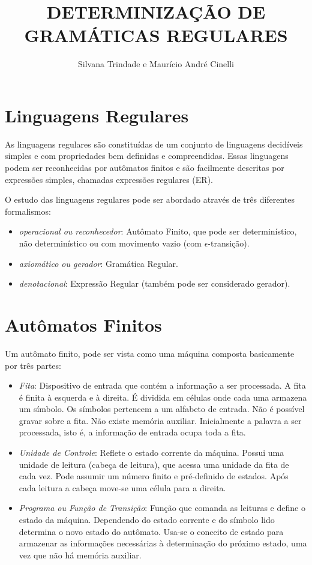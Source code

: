 \documentclass[10pt,a4paper,titlepage]{hitec}
\author{Silvana Trindade e Maurício André Cinelli}
\title{DETERMINIZAÇÃO DE GRAMÁTICAS REGULARES }
\begin{document}
\maketitle

\section*{Linguagens Regulares}
As linguagens regulares são constituídas de um conjunto de linguagens decidíveis simples e com propriedades bem definidas e compreendidas. 
Essas linguagens podem ser reconhecidas por autômatos finitos e são facilmente descritas por expressões simples, chamadas expressões regulares (ER).

O estudo das linguagens regulares pode ser abordado através de três diferentes formalismos:

\begin{itemize}
\item \textit{operacional ou reconhecedor}: Autômato Finito, que pode ser determinístico,
não determinístico ou com movimento vazio (com $\epsilon$-transição).
\item \textit{axiomático ou gerador}: Gramática Regular.
\item \textit{denotacional}: Expressão Regular (também pode ser considerado gerador).
\end{itemize}

\section*{Autômatos Finitos}

Um autômato finito, pode ser vista como uma máquina composta basicamente por três
partes:

\begin{itemize}
\item \textit{Fita}: Dispositivo de entrada que contém a informação a ser processada. A fita é finita à esquerda e à direita. 
É dividida em células onde cada uma armazena um símbolo. Os símbolos pertencem a um alfabeto de entrada.
Não é possível gravar sobre a fita.
Não existe memória auxiliar. Inicialmente a palavra a ser processada, isto é, a informação de entrada ocupa toda a fita.

\item \textit{Unidade de Controle}: Reflete o estado corrente da máquina.
Possui uma unidade de leitura (cabeça de leitura), que acessa uma unidade da fita de cada
vez. 
Pode assumir um número finito e pré-definido de estados.
Após cada leitura a cabeça move-se uma célula para a direita.

\item \textit{Programa ou Função de Transição}: Função que comanda as leituras e define o
estado da máquina.
Dependendo do estado corrente e do símbolo lido determina o novo estado do autômato. 
Usa-se o conceito de estado para armazenar as informações necessárias à determinação do próximo estado, uma vez que não há memória auxiliar.

\end{itemize}
\end{document}
